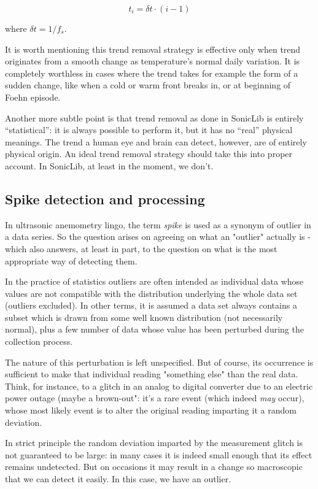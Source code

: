 \documentclass[a4paper,10pt]{book}
\begin{document}
\begin{equation}
  t_{i} = \delta t \cdot (i-1)
\end{equation}

\noindent where $\delta t = 1 / f_{s}$.

It is worth mentioning this trend removal strategy is effective only when trend originates from a smooth change as temperature's normal daily variation. It is completely worthless in cases where the trend takes for example the form of a sudden change, like when a cold or warm front breaks in, or at beginning of Foehn episode.

Another more subtle point is that trend removal as done in SonicLib is entirely ``statistical'': it is always possible to perform it, but it has no ``real'' physical meanings. The trend a human eye and brain can detect, however, are of entirely physical origin. An ideal trend removal strategy should take this into proper account. In SonicLib, at least in the moment, we don't.

\subsection{Spike detection and processing}

In ultrasonic anemometry lingo, the term \emph{spike} is used as a synonym of outlier in a data series. So the question arises on agreeing on what an "outlier" actually is - which also answers, at least in part, to the question on what is the most appropriate way of detecting them.

In the practice of statistics outliers are often intended as individual data whose values are not compatible with the distribution underlying the whole data set (outliers excluded). In other terms, it is assumed a data set always contains a subset which is drawn from some well known distribution (not necessarily normal), plus a few number of data whose value has been perturbed during the collection process.

The nature of this perturbation is left unspecified. But of course, its occurrence is sufficient to make that individual reading "something else" than the real data. Think, for instance, to a glitch in an analog to digital converter due to an electric power outage (maybe a brown-out": it's a rare event (which indeed \emph{may} occur), whose most likely event is to alter the original reading imparting it a random deviation.

In strict principle the random deviation imparted by the measurement glitch is not guaranteed to be large: in many cases it is indeed small enough that its effect remains undetected. But on occasions it may result in a change so macroscopic that we can detect it easily. In this case, we have an outlier.
\end{document}
